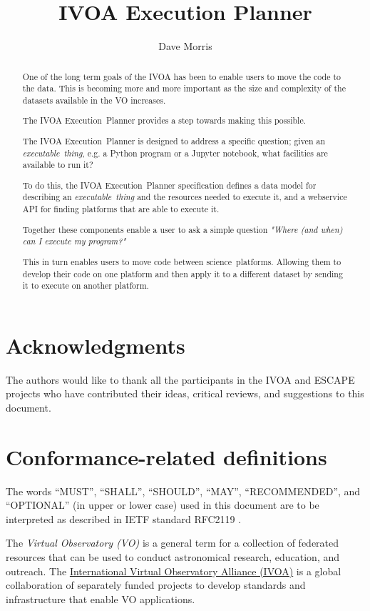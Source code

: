 \documentclass[11pt,a4paper]{ivoa}
\title{IVOA Execution Planner}
\author[http://www.ivoa.net/twiki/bin/view/IVOA/DaveMorris]
       {Dave Morris}
\newcommand{\webservice} {webservice}
\newcommand{\ivoa} {IVOA}
\newcommand{\executionplanner} {Execution~Planner}
\newcommand{\jupyter} {Jupyter}
\newcommand{\python} {Python}
\newcommand{\footurl}[1] {\footnote{\url{#1}}}
\newcommand{\dataset} {dataset}
\newcommand{\scienceplatform} {science~platform}
\newcommand{\executablething} {\textit{executable~thing}}
\begin{document}
\begin{abstract}

One of the long term goals of the IVOA has been to enable users to
move the code to the data.
This is becoming more and more important as the size and complexity
of the \dataset{}s available in the VO increases.

The \ivoa{} \executionplanner{} provides a step towards making this possible.

The \ivoa{} \executionplanner{} is designed to address a specific question;
given an \executablething{}, e.g. a \python{} program or a \jupyter{} notebook,
what facilities are available to run it?

To do this, the \ivoa{} \executionplanner{} specification defines
a data model for describing an \executablething{}
and the resources needed to execute it,
and a \webservice{} API for finding platforms
that are able to execute it.

Together these components enable a user to ask a simple question
\textit{"Where (and when) can I execute my program?"}

This in turn enables users to move code between \scienceplatform{}s.
Allowing them to develop their code on one platform and then apply it to a different
\dataset{} by sending it to execute on another platform.

\end{abstract}

\section*{Acknowledgments}

The authors would like to thank all the participants in the IVOA and ESCAPE projects
who have contributed their ideas, critical reviews, and suggestions to this document.

\section*{Conformance-related definitions}

The words ``MUST'', ``SHALL'', ``SHOULD'', ``MAY'', ``RECOMMENDED'', and
``OPTIONAL'' (in upper or lower case) used in this document are to be
interpreted as described in IETF standard RFC2119 \citep{std:RFC2119}.

The \emph{Virtual Observatory (VO)} is a general term for a collection of
federated resources that can be used to conduct astronomical research,
education, and outreach.
The \href{https://www.ivoa.net}{International Virtual Observatory Alliance (IVOA)}
is a global collaboration of separately funded projects to develop standards and
infrastructure that enable VO applications.
\end{document}
